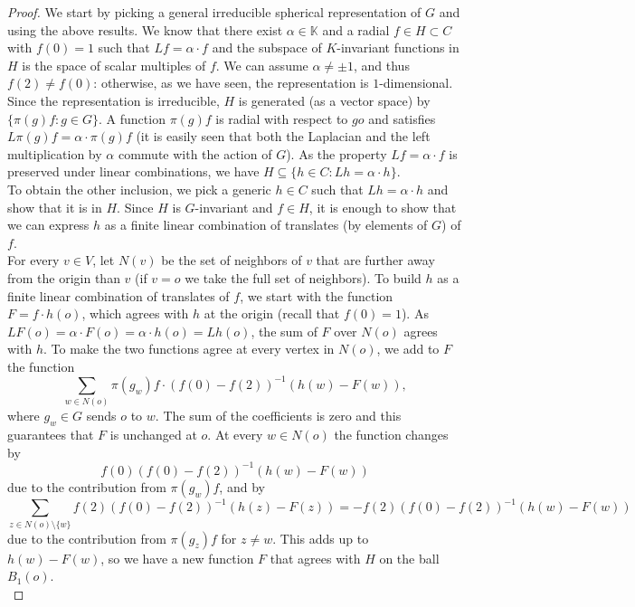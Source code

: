 \documentclass{article}
\theoremstyle{definition}
\theoremstyle{remark}
\theoremstyle{plain}
\begin{document}
\begin{proof}
We start by picking a general irreducible spherical representation of $G$ and using the above results. We know that there exist $\alpha\in\mathbb{K}$ and a radial $f\in H\subset C$ with $f(0)=1$ such that $Lf=\alpha\cdot f$ and the subspace of $K$-invariant functions in $H$ is the space of scalar multiples of $f$. We can assume $\alpha\neq\pm 1$, and thus $f(2)\neq f(0)$: otherwise, as we have seen, the representation is $1$-dimensional. \\

Since the representation is irreducible, $H$ is generated (as a vector space) by $\{\pi(g)f: g\in G\}$. A function $\pi(g)f$ is radial with respect to $go$ and satisfies $L\pi(g)f=\alpha\cdot \pi(g)f$ (it is easily seen that both the Laplacian and the left multiplication by $\alpha$ commute with the action of $G$). As the property $Lf=\alpha\cdot f$ is preserved under linear combinations, we have $H\subseteq\{h\in C: Lh=\alpha\cdot h\}$. \\

To obtain the other inclusion, we pick a generic $h\in C$ such that $Lh=\alpha\cdot h$ and show that it is in $H$. Since $H$ is $G$-invariant and $f\in H$, it is enough to show that we can express $h$ as a finite linear combination of translates (by elements of $G$) of $f$. \\

For every $v\in V$, let $N(v)$ be the set of neighbors of $v$ that are further away from the origin than $v$ (if $v=o$ we take the full set of neighbors). To build $h$ as a finite linear combination of translates of $f$, we start with the function $F=f\cdot h(o)$, which agrees with $h$ at the origin (recall that $f(0)=1$). As $LF(o)=\alpha\cdot F(o)=\alpha\cdot h(o)=Lh(o)$, the sum of $F$ over $N(o)$ agrees with $h$. To make the two functions agree at every vertex in $N(o)$, we add to $F$ the function $$\sum_{w\in N(o)}{\pi(g_w)f\cdot(f(0)-f(2))^{-1}(h(w)-F(w))},$$ where $g_w\in G$ sends $o$ to $w$. The sum of the coefficients is zero and this guarantees that $F$ is unchanged at $o$. At every $w\in N(o)$ the function changes by $$f(0)(f(0)-f(2))^{-1}(h(w)-F(w))$$ due to the contribution from $\pi(g_w)f$, and by $$\sum_{z\in N(o)\setminus\{w\}}{f(2)(f(0)-f(2))^{-1}(h(z)-F(z))}=-f(2)(f(0)-f(2))^{-1}(h(w)-F(w))$$ due to the contribution from $\pi(g_z)f$ for $z\neq w$. This adds up to $h(w)-F(w)$, so we have a new function $F$ that agrees with $H$ on the ball $B_1(o)$. \\


\end{proof}
\end{document}
